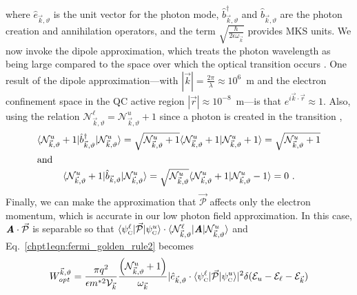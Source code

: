 \documentclass[12pt]{report}
\begin{document}
where $\hat{e}_{\vec{k},\vartheta}$ is the unit vector for the photon mode, $\hat{b}^\dagger_{\vec{k},\vartheta}$ and $\hat{b}_{\vec{k},\vartheta}$ are the photon creation and annihilation operators, and the term $\sqrt{\frac{\hslash}{2 \epsilon \omega_{\vec{k}}}}$ provides MKS units.  We now invoke the dipole approximation, which treats the photon wavelength as being large compared to the space over which the optical transition occurs \cite{Parker:book:2005}. One result of the dipole approximation---with $|\vec{k}|=\frac{2\pi}{\lambda}\approx10^6$~m and the electron confinement space in the QC active region $|\vec{r}|\approx10^{-8}$~m---is that $e^{i \vec{k} \cdot \vec{r}}\approx1$.  Also, using the relation $\mathcal{N}_{\vec{k},\vartheta}^\ell=\mathcal{N}_{\vec{k},\vartheta}^u+1$ since a photon is created in the transition ,
\begin{subequations}
\begin{gather}
\langle \mathcal{N}_{\vec{k},\vartheta}^u+1 | \hat{b}^\dagger_{\vec{k},\vartheta} | \mathcal{N}_{\vec{k},\vartheta}^u \rangle =  \sqrt{\mathcal{N}_{\vec{k},\vartheta}^u+1} \langle \mathcal{N}_{\vec{k},\vartheta}^u+1 | \mathcal{N}_{\vec{k},\vartheta}^u+1 \rangle = \sqrt{\mathcal{N}_{\vec{k},\vartheta}^u+1}\\
\intertext{and}
\langle \mathcal{N}_{\vec{k},\vartheta}^u+1 | \hat{b}_{\vec{k},\vartheta} | \mathcal{N}_{\vec{k},\vartheta}^u \rangle = \sqrt{\mathcal{N}_{\vec{k},\vartheta}^u} \langle \mathcal{N}_{\vec{k},\vartheta}^u+1 | \mathcal{N}_{\vec{k},\vartheta}^u-1 \rangle = 0 \textnormal{~.}
\end{gather}
\end{subequations}
Finally, we can make the approximation that $\vec{\mathcal{P}}$ affects only the electron momentum, which is accurate in our low photon field approximation.  In this case, $\textit{\textbf{A}} \cdot \vec{\mathcal{P}}$ is separable so that $\langle \psi_{\textnormal{\tiny{C}}}^\ell | \vec{\mathcal{P}} | \psi_{\textnormal{\tiny{C}}}^u \rangle \cdot \langle \mathcal{N}_{\vec{k},\vartheta}^\ell \vert \textit{\textbf{A}} \vert \mathcal{N}_{\vec{k},\vartheta}^u  \rangle$
and Eq.~\eqref{chpt1eqn:fermi_golden_rule2} becomes
\begin{equation}
\label{chpt1eqn:fermi_golden_rule3}
W_\textit{opt}^{\vec{k},\vartheta} = \frac{\pi q^2}{\epsilon m^{*2} \mathcal{V}_{\vec{k}}}
\frac{\left(\mathcal{N}_{\vec{k},\vartheta}^u+1\right)}{\omega_{\vec{k}}}
\vert \hat{e}_{\vec{k},\vartheta} \cdot \langle \psi_\tn{\tiny{C}}^\ell \vert \vec{\mathcal{P}}
\vert \psi_\tn{\tiny{C}}^u\rangle\vert^2 \delta(\EE_u-\EE_\ell-\EE_{\vec{k}})
\end{equation}
\end{document}
